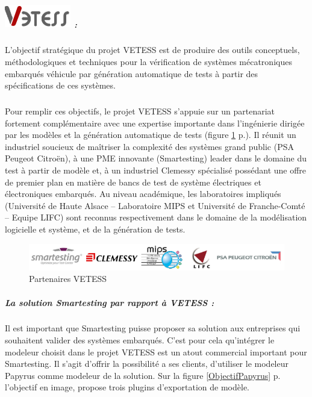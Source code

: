 \subparagraph*{\includegraphics[height=1cm]{images/logo-vetess.png} :}
L’objectif stratégique du projet VETESS est de produire des outils conceptuels, méthodologiques et techniques pour la vérification de systèmes mécatroniques embarqués véhicule par génération automatique de tests à partir des spécifications de ces systèmes.


\subparagraph*{}
Pour remplir ces objectifs, le projet VETESS s’appuie sur un partenariat fortement complémentaire avec une expertise importante dans l’ingénierie dirigée par les modèles et la génération automatique de tests (figure \ref{figure:PartenairesVetess} p.\pageref{figure:PartenairesVetess}). 
Il réunit un industriel soucieux de maîtriser la complexité des systèmes grand public (PSA Peugeot Citroën), à une PME innovante (Smartesting) leader dans le domaine du test à partir de modèle et, à un industriel Clemessy spécialisé possédant une offre de premier plan en matière de bancs de test de système électriques et électroniques embarqués. 
Au niveau académique, les laboratoires impliqués (Université de Haute Alsace – Laboratoire MIPS et Université de Franche-Comté – Equipe LIFC) sont reconnus respectivement dans le domaine de la modélisation logicielle et système, et de la génération de tests.

\begin{figure}[!ht]
\begin{center}
  \includegraphics[width=\textwidth]{images/PartenaireVetess.png}
  \caption{Partenaires VETESS}
  \label{figure:PartenairesVetess}
\end{center}
\end{figure}

\subparagraph{La solution Smartesting par rapport à VETESS :}
Il est important que Smartesting puisse proposer sa solution aux entreprises qui souhaitent valider des systèmes embarqués.
C'est pour cela qu'intégrer le modeleur choisit dans le projet VETESS est un atout commercial important pour Smartesting.
Il s'agit d'offrir la possibilité a ses clients, d'utiliser le modeleur Papyrus comme modeleur de la solution.
Sur la figure \ref{ObjectifPapyrus} p.\pageref{ObjectifPapyrus} l'objectif en image, propose trois plugins d'exportation de modèle.

